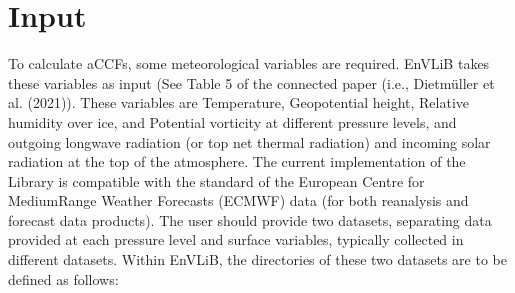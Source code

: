 \documentclass[a4paper,11pt,english]{sphinxmanual}
\begin{document}
\section{Input}
\label{\detokenize{gStarted:input}}
\sphinxAtStartPar
To calculate aCCFs, some meteorological variables are required. EnVLiB takes these variables as input (See Table 5 of the connected paper (i.e., Dietmüller et al. (2021)).
These variables are Temperature, Geopotential height, Relative humidity over ice, and Potential vorticity at different pressure levels,
and outgoing longwave radiation (or top net thermal radiation) and incoming solar radiation at the top of the atmosphere.
The current implementation of the Library is compatible with the standard of the European Centre for Medium\sphinxhyphen{}Range Weather Forecasts (ECMWF) data (for both reanalysis and forecast data products).
The user should provide two datasets, separating data provided at each pressure level and surface variables, typically collected in different datasets. Within EnVLiB, the directories of these two datasets are to be defined as follows:

\begin{sphinxVerbatim}[commandchars=\\\{\}]
  
\PYG{p}{[}\PYG{p}{]}     
\PYG{p}{[}\PYG{p}{]}     
\end{sphinxVerbatim}
\end{document}

